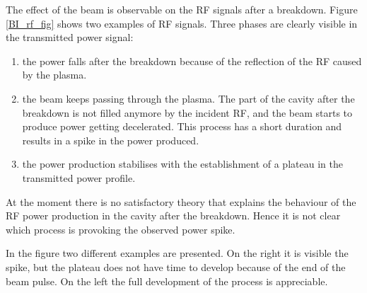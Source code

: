 The effect of the beam is observable on the RF signals after a breakdown. Figure \ref{BI_rf_fig}  shows two examples of RF signals. Three phases are clearly visible in the transmitted power signal: 
\begin{enumerate}
\item the power falls after the breakdown because of the reflection of the RF caused by the plasma.
\item the beam keeps passing through the plasma. The part of the cavity after the breakdown is not filled anymore by the incident RF, and the beam starts to produce power getting decelerated. This process has a short duration and results in a spike in the power produced. 
\item the power production stabilises with the establishment of a plateau in the transmitted power profile.
\end{enumerate}
At the moment there is no satisfactory theory that explains the behaviour of the RF power production in the cavity after the breakdown. Hence it is not clear which process is provoking the observed power spike.

In the figure two different examples are presented. On the right it is visible the spike, but the plateau does not have time to develop because of the end of the beam pulse. On the left the full development of the process is appreciable.

